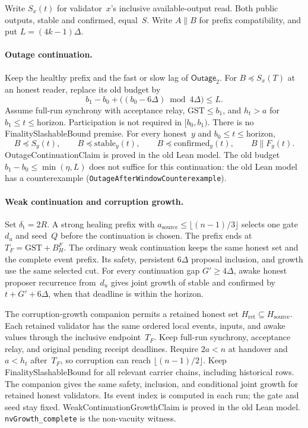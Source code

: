 \documentclass{article}
\begin{document}
Write $S_x(t)$ for validator~$x$'s inclusive available-output read.
Both public outputs, stable and confirmed, equal~$S$.  Write $A\parallel B$
for prefix compatibility, and put $L=(4k-1)\Delta$.

\paragraph{Outage continuation.}
Keep the healthy prefix and the fast or slow lag of $\textsf{Outage}_2$.
For $B\preceq S_x(T)$ at an honest reader, replace its old budget by
\[
 b_1-b_0+\bigl((b_0-6\Delta)\bmod 4\Delta\bigr)\leq L. \tag{V}
\]
Assume full-run synchrony with acceptance relay, $\mathrm{GST}\leq b_1$,
and $h_t>a$ for $b_1\leq t\leq\mathrm{horizon}$.  Participation is not
required in $[b_0,b_1)$.  There is no \textsf{FinalitySlashableBound}
premise.  For every honest~$y$ and $b_0\leq t\leq\mathrm{horizon}$,
\[
 B\preceq S_y(t),\qquad B\preceq\mathrm{stable}_y(t),\qquad
 B\preceq\mathrm{confirmed}_y(t),\qquad B\parallel F_y(t).
\]
\textsf{OutageContinuationClaim} is proved in the old Lean model.  The old budget
$b_1-b_0\leq\min(\eta,L)$ does not suffice for this continuation:
the old Lean model has a counterexample
(\texttt{OutageAfterWindowCounterexample}).

\paragraph{Weak continuation and corruption growth.}
Set $\delta_{\mathrm t}=2R$.  A strong healing prefix with
$a_{\mathrm{source}}\leq\lfloor(n-1)/3\rfloor$ selects one gate~$d_u$
and seed~$Q$ before the continuation is chosen.  The prefix ends at
$T_F=\mathrm{GST}+B_H^F$.  The ordinary weak continuation keeps the
same honest set and the complete event prefix.  Its safety, persistent
$6\Delta$ proposal inclusion, and growth use the same selected cut.
For every continuation gap $G'\geq4\Delta$, awake honest proposer
recurrence from~$d_u$ gives joint growth of stable and confirmed by
$t+G'+6\Delta$, when that deadline is within the horizon.

The corruption-growth companion permits a retained honest set
$H_{\mathrm{ret}}\subseteq H_{\mathrm{source}}$.  Each retained
validator has the same ordered local events, inputs, and awake values
through the inclusive endpoint~$T_F$.  Keep full-run synchrony,
acceptance relay, and original pending receipt deadlines.  Require
$2a<n$ at handover and $a<h_t$ after~$T_F$, so corruption can reach
$\lfloor(n-1)/2\rfloor$.  Keep \textsf{FinalitySlashableBound} for
all relevant carrier chains, including historical rows.  The companion
gives the same safety, inclusion, and conditional joint growth for
retained honest validators.  Its event index is computed in each run;
the gate and seed stay fixed.  \textsf{WeakContinuationGrowthClaim}
is proved in the old Lean model.
\texttt{nvGrowth\_complete} is the non-vacuity witness.
\end{document}
